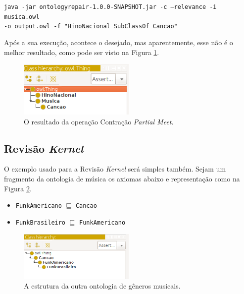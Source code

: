 \begin{small}
	\texttt{java -jar ontologyrepair-1.0.0-SNAPSHOT.jar -c --relevance -i musica.owl \\ -o output.owl -f "HinoNacional SubClassOf Cancao"}
\end{small}

Após a sua execução, acontece o desejado, mas aparentemente, esse não é o melhor resultado, como pode ser visto na Figura \ref{img:cpm2}.

\begin{figure}[H]
	\centering
	\includegraphics[width=0.5\textwidth]{Capitulos/Implementacao/cpm2.png}
	\caption{O resultado da operação Contração \textit{Partial Meet}.}
	\label{img:cpm2}
\end{figure}

\subsection{Revisão \textit{Kernel}}

O exemplo usado para a Revisão \textit{Kernel} será simples também. Sejam um fragmento da ontologia de música os axiomas abaixo e representação como na Figura \ref{img:r1}.

\begin{itemize}
	\item \texttt{FunkAmericano} $ \sqsubseteq $ \texttt{Cancao}
	\item \texttt{FunkBrasileiro} $ \sqsubseteq $ \texttt{FunkAmericano}
\end{itemize}

\begin{figure}[H]
	\centering
	\includegraphics[width=0.5\textwidth]{Capitulos/Implementacao/r1.png}
	\caption{A estrutura da outra ontologia de gêneros musicais.}
	\label{img:r1}
\end{figure}

